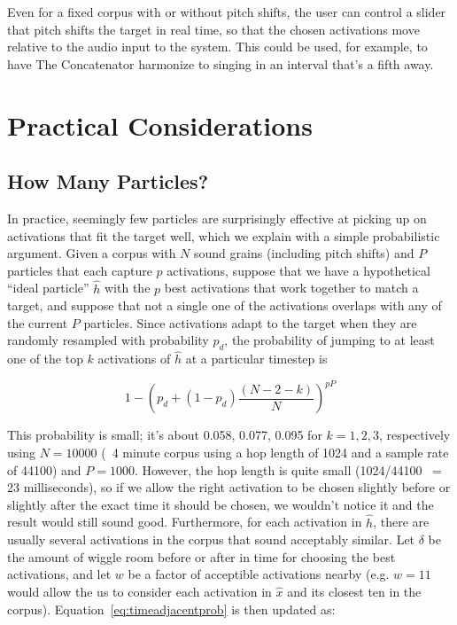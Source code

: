 \documentclass{article}
\begin{document}
Even for a fixed corpus with or without pitch shifts, the user can control a slider that pitch shifts the target in real time, so that the chosen activations move relative to the audio input to the system.  This could be used, for example, to have The Concatenator harmonize to singing in an interval that's a fifth away.

\section{Practical Considerations}

\subsection{How Many Particles?}
\label{sec:activationprob}

In practice, seemingly few particles are surprisingly effective at picking up on activations that fit the target well, which we explain with a simple probabilistic argument.  Given a corpus with $N$ sound grains (including pitch shifts) and $P$ particles that each capture $p$ activations, suppose that we have a hypothetical ``ideal particle'' $\hat{h}$ with the $p$ best activations that work together to match a target, and suppose that not a single one of the activations overlaps with any of the current $P$ particles.  Since activations adapt to the target when they are randomly resampled with probability $p_d$, the probability of jumping to at least one of the top $k$ activations of $\hat{h}$ at a particular timestep is 

\begin{equation}
    \label{eq:timeadjacentprob}
    1 - \left( p_d + (1-p_d) \frac{(N-2-k)}{N} \right)^{pP}
\end{equation}

This probability is small; it's about 0.058, 0.077, 0.095 for $k = 1, 2, 3$, respectively using $N=10000$ (~4 minute corpus using a hop length of 1024 and a sample rate of 44100) and $P=1000$.  However, the hop length is quite small (1024/44100 ~= 23 milliseconds), so if we allow the right activation to be chosen slightly before or slightly after the exact time it should be chosen, we wouldn't notice it and the result would still sound good.  Furthermore, for each activation in $\hat{h}$, there are usually several activations in the corpus that sound acceptably similar.  Let $\delta$ be the amount of wiggle room before or after in time for choosing the best activations, and let $w$ be a factor of acceptible activations nearby (e.g. $w=11$ would allow the us to consider each activation in $\hat{x}$ and its closest ten in the corpus).  Equation~\ref{eq:timeadjacentprob} is then updated as:
\end{document}
